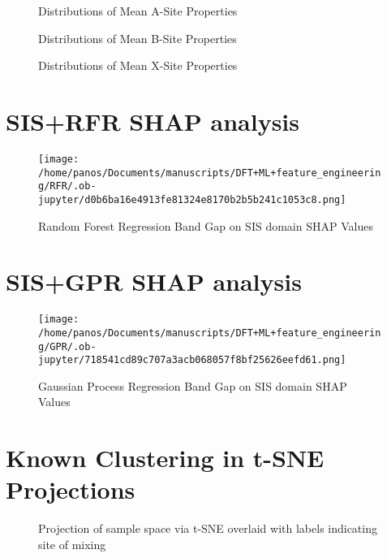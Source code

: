  
\begin{figure}[htbp]
\centering

\caption{Distributions of Mean A-Site Properties}
\end{figure}

 
\begin{figure}[htbp]
\centering

\caption{Distributions of Mean B-Site Properties}
\end{figure}

 
\begin{figure}[htbp]
\centering

\caption{Distributions of Mean X-Site Properties}
\end{figure}

\section*{SIS+RFR SHAP analysis}
\label{sec:org9cb877b}
\begin{figure}[htbp]
\centering
\texttt{[image: /home/panos/Documents/manuscripts/DFT+ML+feature\_engineering/RFR/.ob-jupyter/d0b6ba16e4913fe81324e8170b2b5b241c1053c8.png]}
\caption{\label{fig:rfrSHAPe} Random Forest Regression Band Gap on SIS domain SHAP Values}
\end{figure}

\section*{SIS+GPR SHAP analysis}
\label{sec:org4ade3f5}
\begin{figure}[htbp]
\centering
\texttt{[image: /home/panos/Documents/manuscripts/DFT+ML+feature\_engineering/GPR/.ob-jupyter/718541cd89c707a3acb068057f8bf25626eefd61.png]}
\caption{\label{fig:gprSHAPe} Gaussian Process Regression Band Gap on SIS domain SHAP Values}
\end{figure}

\section*{Known Clustering in t-SNE Projections}
\label{sec:org1d13a8e}
 
\begin{figure}[htbp]
\centering

\caption{\label{fig:alloys} Projection of sample space via t-SNE overlaid with labels indicating site of mixing}
\end{figure}

